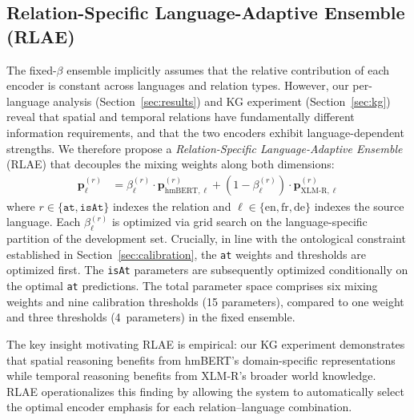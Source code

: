 \documentclass[11pt,a4paper]{article}
\begin{document}
\subsection{Relation-Specific Language-Adaptive Ensemble (RLAE)}
\label{sec:rlae}

The fixed-$\beta$ ensemble implicitly assumes that the relative contribution of each encoder is constant across languages and relation types. However, our per-language analysis (Section~\ref{sec:results}) and KG experiment (Section~\ref{sec:kg}) reveal that spatial and temporal relations have fundamentally different information requirements, and that the two encoders exhibit language-dependent strengths. We therefore propose a \emph{Relation-Specific Language-Adaptive Ensemble} (RLAE) that decouples the mixing weights along both dimensions:
\begin{align}
    \mathbf{p}^{(r)}_{\ell} &= \beta^{(r)}_{\ell} \cdot \mathbf{p}^{(r)}_{\text{hmBERT},\ell} + (1 - \beta^{(r)}_{\ell}) \cdot \mathbf{p}^{(r)}_{\text{XLM-R},\ell} \label{eq:rlae}
\end{align}
where $r \in \{\texttt{at}, \texttt{isAt}\}$ indexes the relation and $\ell \in \{\text{en}, \text{fr}, \text{de}\}$ indexes the source language. Each $\beta^{(r)}_{\ell}$ is optimized via grid search on the language-specific partition of the development set. Crucially, in line with the ontological constraint established in Section~\ref{sec:calibration}, the \texttt{at} weights and thresholds are optimized first. The \texttt{isAt} parameters are subsequently optimized conditionally on the optimal \texttt{at} predictions. The total parameter space comprises six mixing weights and nine calibration thresholds (15 parameters), compared to one weight and three thresholds (4~parameters) in the fixed ensemble.

The key insight motivating RLAE is empirical: our KG experiment demonstrates that spatial reasoning benefits from hmBERT's domain-specific representations while temporal reasoning benefits from XLM-R's broader world knowledge. RLAE operationalizes this finding by allowing the system to automatically select the optimal encoder emphasis for each relation--language combination.
\end{document}
